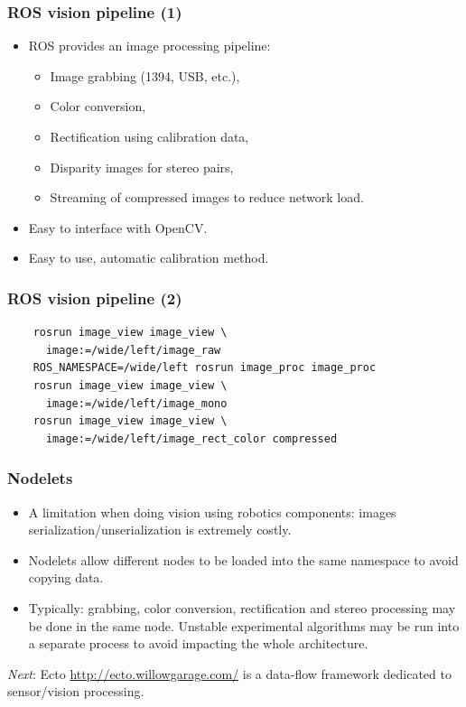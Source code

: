 \documentclass[hyperref={pdfpagelabels=false}]{beamer}
\begin{document}
\begin{frame}[fragile]
  \frametitle{ROS vision pipeline (1)}

  \begin{itemize}
  \item ROS provides an image processing pipeline:
    \begin{itemize}
      \item Image grabbing (1394, USB, etc.),
      \item Color conversion,
      \item Rectification using calibration data,
      \item Disparity images for stereo pairs,
      \item Streaming of compressed images to reduce network load.
    \end{itemize}
    \item Easy to interface with OpenCV.
    \item Easy to use, automatic calibration method.
  \end{itemize}
\end{frame}

\begin{frame}[fragile]
  \frametitle{ROS vision pipeline (2)}

  \begin{verbatim}
    rosrun image_view image_view \
      image:=/wide/left/image_raw
    ROS_NAMESPACE=/wide/left rosrun image_proc image_proc
    rosrun image_view image_view \
      image:=/wide/left/image_mono
    rosrun image_view image_view \
      image:=/wide/left/image_rect_color compressed
  \end{verbatim}
\end{frame}

\begin{frame}[fragile]
  \frametitle{Nodelets}

  \begin{itemize}
  \item A limitation when doing vision using robotics components:
    images serialization/unserialization is extremely costly.
  \item Nodelets allow different nodes to be loaded into the same
    namespace to avoid copying data.
  \item Typically: grabbing, color conversion, rectification and
    stereo processing may be done in the same node. Unstable
    experimental algorithms may be run into a separate process to
    avoid impacting the whole architecture.
  \end{itemize}

  \textit{Next}: Ecto \url{http://ecto.willowgarage.com/} is a
  data-flow framework dedicated to sensor/vision processing.
\end{frame}
\end{document}
